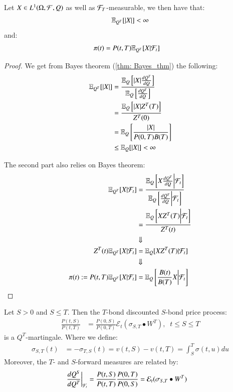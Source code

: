 \begin{proposition}
\label{prop: general_option_price}
Let $X \in L^{1}(\Omega, \mathcal{F}, Q)$ as well as $\mathcal{F}_{T}$-measurable, we then have that: 
\[
\mathbb{E}_{Q^{T}}[|X|] < \infty
\]
and: 
\begin{align*}
\pi(t) &= P(t,T)\mathbb{E}_{Q^{T}}[X|\mathcal{F}_{t}]    
\end{align*}
\end{proposition}

\begin{proof}
We get from Bayes theorem (\ref{thm: Bayes_thm}) the following: 
\begin{align*}
\mathbb{E}_{Q^{T}}[|X|] &= \frac{
\mathbb{E}_{Q}\left[|X|\frac{dQ^{T}}{dQ}\right]
}{
\mathbb{E}_{Q}\left[\frac{dQ^{T}}{dQ}\right]
} \\ 
&= 
\frac{
\mathbb{E}_{Q}\left[|X|Z^{T}(T)\right]
}{
Z^{T}(0)
} \\ 
&= 
\mathbb{E}_{Q}\left[
\frac{|X|}{P(0,T)B(T)}
\right] \\
&\leq \mathbb{E}_{Q}[|X|] < \infty
\end{align*}

The second part also relies on Bayes theorem: 
\begin{align*}
\mathbb{E}_{Q^{T}}[X|\mathcal{F}_{t}]
&= 
\frac{
\mathbb{E}_{Q}\left[
X\frac{dQ^{T}}{dQ}\bigg{|}\mathcal{F}_{t}
\right]
}{
\mathbb{E}_{Q}\left[
\frac{dQ^{T}}{dQ}\bigg{|}\mathcal{F}_{t}
\right]
} \\ 
&= 
\frac{
\mathbb{E}_{Q}\left[
XZ^{T}(T)\bigg{|}\mathcal{F}_{t}
\right]
}{
Z^{T}(t)
} \\ 
&\Downarrow \\ 
Z^{T}(t)\mathbb{E}_{Q^{T}}[X|\mathcal{F}_{t}] &= \mathbb{E}_{Q}[XZ^{T}(T)|\mathcal{F}_{t}] \\ 
&\Downarrow \\ 
\pi(t):= P(t,T)\mathbb{E}_{Q^{T}}[X|\mathcal{F}_{t}] &= \mathbb{E}_{Q}\left[
\frac{B(t)}{B(T)}X\bigg{|}\mathcal{F}_{t}
\right]
\end{align*}

\end{proof}


\begin{lemma}
\label{lemma: T-discounted-S-discounted-bond}
Let $S>0$ and $S\leq T$. Then the $T$-bond discounted $S$-bond price process:
\begin{align*}
\frac{P(t,S)}{P(t,T)}
&= 
\frac{P(0,S)}{P(0,T)}\mathcal{E}_{t}(\sigma_{S,T}\bullet W^{T}), \;\;t\leq S\leq T
\end{align*}
is a $Q^{T}$-martingale. Where we define: 
\begin{align*}
\sigma_{S,T}(t) &= - \sigma_{T,S}(t) = v(t,S) - v(t,T) = \int_{S}^{T}\sigma(t,u)du    
\end{align*}
Moreover, the $T$- and $S$-forward measures are related by: 
\begin{align*}
\frac{dQ^{S}}{dQ^{T}}\bigg{|}_{\mathcal{F}_{t}}
&= 
\frac{P(t,S)}{P(t,T)}\frac{P(0,T)}{P(0,S)} = \mathcal{E}_{t}(\sigma_{S,T}\bullet W^{T})
\end{align*}
\end{lemma}

